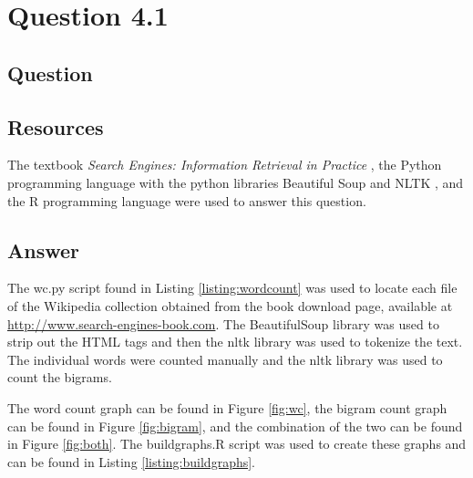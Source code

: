 \section{Question 4.1}

\subsection{Question}


\subsection{Resources}
The textbook \textit{Search Engines: Information Retrieval in Practice} \cite{seirip}, the Python programming language \cite{python} with the python libraries Beautiful Soup \cite{py:beautifulsoup} and NLTK \cite{py:nltk}, and the R programming language \cite{rlang} were used to answer this question.

\subsection{Answer}
The wc.py script found in Listing \ref{listing:wordcount} was used to locate each file of the Wikipedia collection obtained from the book download page, available at \url{http://www.search-engines-book.com}.  The BeautifulSoup library was used to strip out the HTML tags and then the nltk library \cite{py:nltk} was used to tokenize the text.  The individual words were counted manually and the nltk library \cite{py:nltk} was used to count the bigrams.

The word count graph can be found in Figure \ref{fig:wc}, the bigram count graph can be found in Figure \ref{fig:bigram}, and the combination of the two can be found in Figure \ref{fig:both}.  The buildgraphs.R script was used to create these graphs and can be found in Listing \ref{listing:buildgraphs}.

